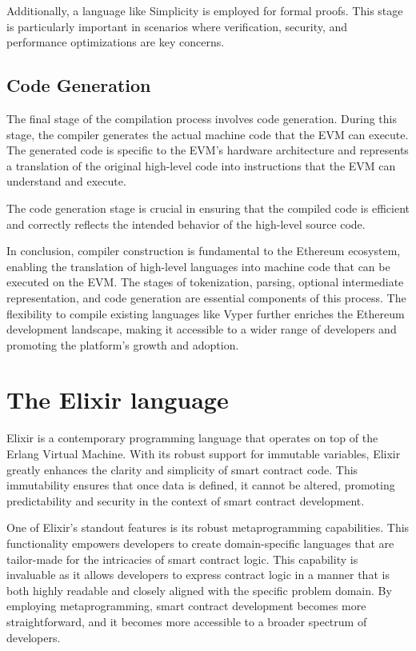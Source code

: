 Additionally, a language like Simplicity is employed for formal proofs. This stage is particularly important in scenarios where verification, security, and performance optimizations are key concerns.

\subsection{Code Generation}

The final stage of the compilation process involves code generation. During this stage, the compiler generates the actual machine code that the EVM can execute. The generated code is specific to the EVM's hardware architecture and represents a translation of the original high-level code into instructions that the EVM can understand and execute.

The code generation stage is crucial in ensuring that the compiled code is efficient and correctly reflects the intended behavior of the high-level source code.


In conclusion, compiler construction is fundamental to the Ethereum ecosystem, enabling the translation of high-level languages into machine code that can be executed on the EVM. The stages of tokenization, parsing, optional intermediate representation, and code generation are essential components of this process. The flexibility to compile existing languages like Vyper further enriches the Ethereum development landscape, making it accessible to a wider range of developers and promoting the platform's growth and adoption.

\section{The Elixir language}
\label{sec:ex}

Elixir is a contemporary programming language that operates on top of the Erlang Virtual Machine. With its robust support for immutable variables, Elixir greatly enhances the clarity and simplicity of smart contract code. This immutability ensures that once data is defined, it cannot be altered, promoting predictability and security in the context of smart contract development.

One of Elixir's standout features is its robust metaprogramming capabilities. This functionality empowers developers to create domain-specific languages that are tailor-made for the intricacies of smart contract logic. This capability is invaluable as it allows developers to express contract logic in a manner that is both highly readable and closely aligned with the specific problem domain. By employing metaprogramming, smart contract development becomes more straightforward, and it becomes more accessible to a broader spectrum of developers.

